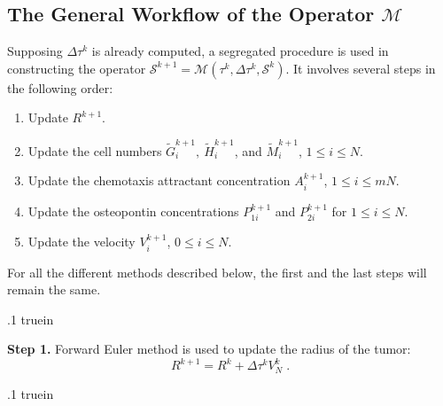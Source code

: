 \documentclass{amsart}
\theoremstyle{definition}
\theoremstyle{remark}
\numberwithin{equation}{section}
\numberwithin{figure}{section}
\begin{document}
\subsection{The General Workflow of the Operator \texorpdfstring{$\mathcal{M}$}{M}}
Supposing $\Delta\tau^k$ is already computed, a segregated procedure is used in constructing the operator $\mathcal{S}^{k+1} = \mathcal{M}(\tau^k, \Delta\tau^k, \mathcal{S}^k)$.
It involves several steps in the following order:
\begin{enumerate}
\item Update $R^{k+1}$.
\item Update the cell numbers $\tilde{G}_i^{k+1},\ \tilde{H}_i^{k+1}$, and $\tilde{M}_i^{k+1}$, $1\le i\le N$.
\item Update the chemotaxis attractant concentration $A_i^{k+1}$, $1\le i\le mN$.
\item Update the osteopontin concentrations $P_{1i}^{k+1}$ and $P_{2i}^{k+1}$ for $1\le i \le N$.
\item Update the velocity $V_i^{k+1}$, $0\le i\le N$.
\end{enumerate}
For all the different methods described below, the first and the last steps will remain the same.

\vglue .1 truein

\noindent
{\bf Step 1.} Forward Euler method is used to update the radius of the tumor:
\begin{equation}\label{eq:num_gen_r}
R^{k+1} = R^k + \Delta\tau^kV_N^k\;.
\end{equation}

\vglue .1 truein
\end{document}
